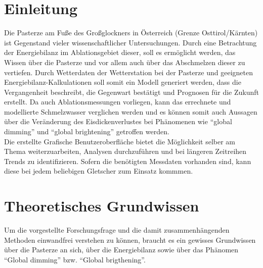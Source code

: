 \documentclass[11pt,a4paper]{article}
\begin{document}
\pagebreak

\tableofcontents
\vspace{1cm}

\pagebreak
\listoffigures
\vspace{1cm}

\pagebreak
\listoftables
\vspace{1cm}


\pagebreak
{}  
\setcounter{page}{1}

\section{Einleitung}
Die Pasterze am Fuße des Großglockners in Österreich (Grenze Osttirol/Kärnten) ist Gegenstand vieler wissenschaftlicher Untersuchungen. Durch eine Betrachtung der Energiebilanz im Ablationsgebiet dieser, soll es ermöglicht werden, das Wissen über die Pasterze und vor allem auch über das Abschmelzen dieser zu vertiefen. Durch Wetterdaten der Wetterstation bei der Pasterze und geeigneten Energiebilanz-Kalkulationen soll somit ein Modell generiert werden, dass die Vergangenheit beschreibt, die Gegenwart bestätigt und Prognosen für die Zukunft erstellt. Da auch Ablationsmessungen vorliegen, kann das errechnete und modellierte Schmelzwasser verglichen werden und es können somit auch Aussagen über die Veränderung des Eisdickenverlustes bei Phänomenen wie ``global dimming'' und ``global brightening'' getroffen werden. \\
Die erstellte Grafische Benutzeroberfläche bietet die Möglichkeit selber am Thema weiterzuarbeiten, Analysen durchzuführen und bei längeren Zeitreihen Trends zu identifizieren. Sofern die benötigten Messdaten vorhanden sind, kann diese bei jedem beliebigen Gletscher zum Einsatz kommmen.


\section{Theoretisches Grundwissen}
Um die vorgestellte Forschungsfrage und die damit zusammenhängenden Methoden einwandfrei verstehen zu können, braucht es ein gewisses Grundwissen über die Pasterze an sich, über die Energiebilanz sowie über das Phänomen ``Global dimming'' bzw. ``Global brigthening''.
\end{document}
